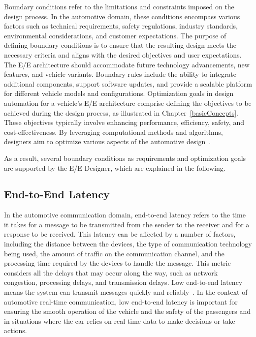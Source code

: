     Boundary conditions refer to the limitations and constraints imposed on the design process. In the automotive domain, these conditions encompass various factors such as technical requirements, safety regulations, industry standards, environmental considerations, and customer expectations. The purpose of defining boundary conditions is to ensure that the resulting design meets the necessary criteria and aligns with the desired objectives and user expectations. 
    The E/E architecture should accommodate future technology advancements, new features, and vehicle variants. Boundary rules include the ability to integrate additional components, support software updates, and provide a scalable platform for different vehicle models and configurations.
    Optimization goals in design automation for a vehicle's E/E architecture comprise defining the objectives to be achieved during the design process, as illustrated in Chapter~\ref{basicConcepts}. These objectives typically involve enhancing performance, efficiency, safety, and cost-effectiveness. By leveraging computational methods and algorithms, designers aim to optimize various aspects of the automotive design~\cite{askaripoor2022architecture, 9565115, 9613692, 9212001, askaripoor2023designer}. 
    
    As a result, several boundary conditions as requirements and optimization goals are supported by the E/E Designer, which are explained in the following.\newline


  
    \subsection{End-to-End Latency}
    
    In the automotive communication domain, end-to-end latency refers to the time it takes for a message to be transmitted from the sender to the receiver and for a response to be received. This latency can be affected by a number of factors, including the distance between the devices, the type of communication technology being used, the amount of traffic on the communication channel, and the processing time required by the devices to handle the message. This metric considers all the delays that may occur along the way, such as network congestion, processing delays, and transmission delays. Low end-to-end latency means the system can transmit messages quickly and reliably~\cite{zhang2014task, askaripoor2022architecture,askaripoor2023designer}.
    In the context of automotive real-time communication, low end-to-end latency is important for ensuring the smooth operation of the vehicle and the safety of the passengers and in situations where the car relies on real-time data to make decisions or take actions. 
        
